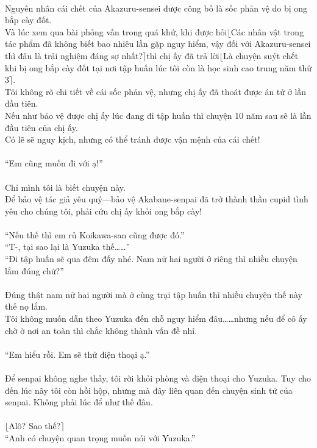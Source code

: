 \documentclass[12pt,a4paper, twosides]{book}
\begin{document}
\\
Nguyên nhân cái chết của Akazuru-sensei được công bố là sốc phản vệ do bị ong bắp cày đốt.\\
Và lúc xem qua bài phỏng vấn trong quá khứ, khi được hỏi$\lfloor$Các nhân vật trong tác phẩm đã không biết bao nhiêu lần gặp nguy hiểm, vậy đối với Akazuru-sensei thì đâu là trải nghiệm đáng sợ nhất?$\rceil$thì chị ấy đã trả lời$\lfloor$Là chuyện suýt chết khi bị ong bắp cày đốt tại nơi tập huấn lúc tôi còn là học sinh cao trung năm thứ 3$\rceil$.\\
Tôi không rõ chi tiết về cái sốc phản vệ, nhưng chị ấy đã thoát được án tử ở lần đầu tiên.\\
Nếu như bảo vệ được chị ấy lúc đang đi tập huấn thì chuyện 10 năm sau sẽ là lần đầu tiên của chị ấy.\\
Có lẽ sẽ nguy kịch, nhưng có thể tránh được vận mệnh của cái chết!\\
\\
“Em cũng muốn đi với ạ!”\\
\\
Chỉ mình tôi là biết chuyện này.\\
Để bảo vệ tác giả yêu quý—bảo vệ Akabane-senpai đã trở thành thần cupid tình yêu cho chúng tôi, phải cứu chị ấy khỏi ong bắp cày!\\
\\
“Nếu thế thì em rủ Koikawa-san cũng được đó.”\\
“T-, tại sao lại là Yuzuka thế……”\\
“Đi tập huấn sẽ qua đêm đấy nhé. Nam nữ hai người ở riêng thì nhiều chuyện lắm đúng chứ?”\\
\\
Đúng thật nam nữ hai người mà ở cùng trại tập huấn thì nhiều chuyện thế này thế nọ lắm.\\
Tôi không muốn dẫn theo Yuzuka đến chỗ nguy hiểm đâu……nhưng nếu để cô ấy chờ ở nơi an toàn thì chắc không thành vấn đề nhỉ.\\
\\
“Em hiểu rồi. Em sẽ thử điện thoại ạ.”\\
\\
Để senpai không nghe thấy, tôi rời khỏi phòng và điện thoại cho Yuzuka. Tuy cho đến lúc nãy tôi còn hồi hộp, nhưng mà đây liên quan đến chuyện sinh tử của senpai. Không phải lúc để như thế đâu.\\
\\
$\lfloor$Alô? Sao thế?$\rceil$\\
“Anh có chuyện quan trọng muốn nói với Yuzuka.”\\
\end{document}
